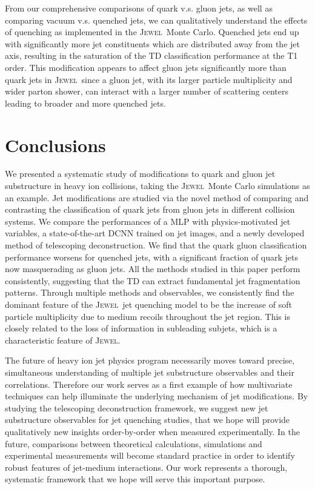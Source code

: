 \documentclass[notoc,preprintnumbers]{JHEP3}
\newcommand{\jw}{\textsc{Jewel}~}
\begin{document}
From our comprehensive comparisons of quark v.s. gluon jets, as well as comparing vacuum v.s. quenched jets, we can qualitatively understand the effects of quenching as implemented in the \jw Monte Carlo. Quenched jets end up with significantly more jet constituents which are distributed away from the jet axis, resulting in the saturation of the TD classification performance at the T1 order. This modification appears to affect gluon jets significantly more than quark jets in \jw since a gluon jet, with its larger particle multiplicity and wider parton shower, can interact with a larger number of scattering centers leading to broader and more quenched jets.

\section{Conclusions}
\label{sec:conc}

We presented a systematic study of modifications to quark and gluon jet substructure in heavy ion collisions, taking the \jw Monte Carlo simulations as an example. Jet modifications are studied via the novel method of comparing and contrasting the classification of quark jets from gluon jets in different collision systems. We compare the performances of a MLP with physics-motivated jet variables, a state-of-the-art DCNN trained on jet images, and a newly developed method of telescoping deconstruction. We find that the quark gluon classification performance worsens for quenched jets, with a significant fraction of quark jets now masquerading as gluon jets. All the methods studied in this paper perform consistently, suggesting that the TD can extract fundamental jet fragmentation patterns. Through multiple methods and observables, we consistently find the dominant feature of the \jw jet quenching model to be the increase of soft particle multiplicity due to medium recoils throughout the jet region. This is closely related to the loss of information in subleading subjets, which is a characteristic feature of \textsc{Jewel}.

The future of heavy ion jet physics program necessarily moves toward precise, simultaneous understanding of multiple jet substructure observables and their correlations. Therefore our work serves as a first example of how multivariate techniques can help illuminate the underlying mechanism of jet modifications. By studying the telescoping deconstruction framework, we suggest new jet substructure observables for jet quenching studies, that we hope will provide qualitatively new insights order-by-order when measured experimentally. In the future, comparisons between theoretical calculations, simulations and experimental measurements will become standard practice in order to identify robust features of jet-medium interactions. Our work represents a thorough, systematic framework that we hope will serve this important purpose.
\end{document}
